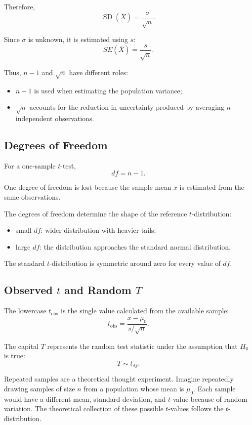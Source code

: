 \documentclass[11pt]{article}
\begin{document}
Therefore,
\[
\operatorname{SD}(\bar{X})=\frac{\sigma}{\sqrt{n}}.
\]

Since \(\sigma\) is unknown, it is estimated using \(s\):
\[
SE(\bar{X})=\frac{s}{\sqrt{n}}.
\]

Thus, \(n-1\) and \(\sqrt{n}\) have different roles:
\begin{itemize}[noitemsep]
    \item \(n-1\) is used when estimating the population variance;
    \item \(\sqrt{n}\) accounts for the reduction in uncertainty produced by averaging \(n\) independent observations.
\end{itemize}

\subsection{Degrees of Freedom}
For a one-sample \(t\)-test,
\[
df=n-1.
\]

One degree of freedom is lost because the sample mean \(\bar{x}\) is estimated from the same observations.

The degrees of freedom determine the shape of the reference \(t\)-distribution:
\begin{itemize}[noitemsep]
    \item small \(df\): wider distribution with heavier tails;
    \item large \(df\): the distribution approaches the standard normal distribution.
\end{itemize}

The standard \(t\)-distribution is symmetric around zero for every value of \(df\).

\subsection{Observed \(t\) and Random \(T\)}
The lowercase \(t_{\mathrm{obs}}\) is the single value calculated from the available sample:
\[
t_{\mathrm{obs}}=\frac{\bar{x}-\mu_0}{s/\sqrt{n}}.
\]

The capital \(T\) represents the random test statistic under the assumption that \(H_0\) is true:
\[
T\sim t_{df}.
\]

Repeated samples are a theoretical thought experiment. Imagine repeatedly drawing samples of size \(n\) from a population whose mean is \(\mu_0\). Each sample would have a different mean, standard deviation, and \(t\)-value because of random variation. The theoretical collection of these possible \(t\)-values follows the \(t\)-distribution.
\end{document}
